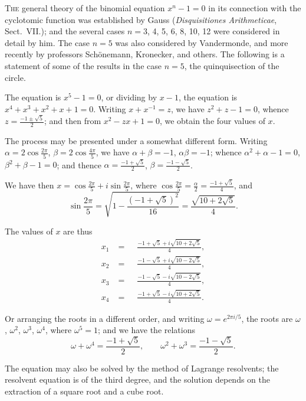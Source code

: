 \documentclass[11pt,a4paper]{book}
\begin{document}
\bigskip

\noindent
\textsc{The} general theory of the binomial equation $x^n - 1 = 0$ in its connection with the cyclotomic function was established by Gauss (\textit{Disquisitiones Arithmeticae}, Sect.~VII.); and the several cases $n = 3$, 4, 5, 6, 8, 10, 12 were considered in detail by him. The case $n = 5$ was also considered by Vandermonde, and more recently by professors Sch\"{o}nemann, Kronecker, and others. The following is a statement of some of the results in the case $n = 5$, the quinquisection of the circle.

The equation is $x^5 - 1 = 0$, or dividing by $x - 1$, the equation is $x^4 + x^3 + x^2 + x + 1 = 0$. Writing $x + x^{-1} = z$, we have $z^2 + z - 1 = 0$, whence $z = \frac{-1 \pm \sqrt{5}}{2}$; and then from $x^2 - zx + 1 = 0$, we obtain the four values of $x$.

The process may be presented under a somewhat different form. Writing $\alpha = 2\cos\frac{2\pi}{5}$, $\beta = 2\cos\frac{4\pi}{5}$, we have $\alpha + \beta = -1$, $\alpha\beta = -1$; whence $\alpha^2 + \alpha - 1 = 0$, $\beta^2 + \beta - 1 = 0$; and thence $\alpha = \frac{-1 + \sqrt{5}}{2}$, $\beta = \frac{-1 - \sqrt{5}}{2}$.

We have then $x = \cos\frac{2\pi}{5} + i\sin\frac{2\pi}{5}$, where $\cos\frac{2\pi}{5} = \frac{\alpha}{2} = \frac{-1 + \sqrt{5}}{4}$, and
\[
\sin\frac{2\pi}{5} = \sqrt{1 - \frac{(-1+\sqrt{5})^2}{16}} = \frac{\sqrt{10 + 2\sqrt{5}}}{4}.
\]

The values of $x$ are thus
\begin{align*}
x_1 &= \phantom{-}\frac{-1 + \sqrt{5} + i\sqrt{10 + 2\sqrt{5}}}{4},\\
x_2 &= \phantom{-}\frac{-1 - \sqrt{5} + i\sqrt{10 - 2\sqrt{5}}}{4},\\
x_3 &= \phantom{-}\frac{-1 - \sqrt{5} - i\sqrt{10 - 2\sqrt{5}}}{4},\\
x_4 &= \phantom{-}\frac{-1 + \sqrt{5} - i\sqrt{10 + 2\sqrt{5}}}{4}.
\end{align*}

Or arranging the roots in a different order, and writing $\omega = e^{2\pi i/5}$, the roots are $\omega$, $\omega^2$, $\omega^3$, $\omega^4$, where $\omega^5 = 1$; and we have the relations
\[
\omega + \omega^4 = \frac{-1 + \sqrt{5}}{2},\qquad \omega^2 + \omega^3 = \frac{-1 - \sqrt{5}}{2}.
\]

The equation may also be solved by the method of Lagrange resolvents; the resolvent equation is of the third degree, and the solution depends on the extraction of a square root and a cube root.
\end{document}
